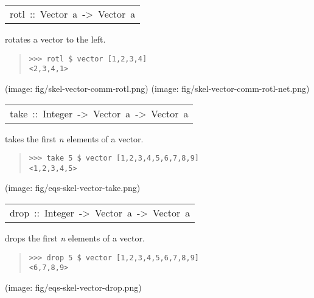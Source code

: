 \begin{haddockdesc}
\item[\begin{tabular}{@{}l}
rotl\ ::\ Vector\ a\ ->\ Vector\ a
\end{tabular}]\haddockbegindoc
rotates a vector to the left.\par
\begin{quote}
{\haddockverb\begin{verbatim}
>>> rotl $ vector [1,2,3,4]
<2,3,4,1>

\end{verbatim}}
\end{quote}(image: fig/skel-vector-comm-rotl.png)
 (image: fig/skel-vector-comm-rotl-net.png)\par
           
\end{haddockdesc}
\begin{haddockdesc}
\item[\begin{tabular}{@{}l}
take\ ::\ Integer\ ->\ Vector\ a\ ->\ Vector\ a
\end{tabular}]\haddockbegindoc
takes the first \emph{n} elements of a vector.\par
\begin{quote}
{\haddockverb\begin{verbatim}
>>> take 5 $ vector [1,2,3,4,5,6,7,8,9]
<1,2,3,4,5>

\end{verbatim}}
\end{quote}(image: fig/eqs-skel-vector-take.png)\par
           
\end{haddockdesc}
\begin{haddockdesc}
\item[\begin{tabular}{@{}l}
drop\ ::\ Integer\ ->\ Vector\ a\ ->\ Vector\ a
\end{tabular}]\haddockbegindoc
drops the first \emph{n} elements of a vector.\par
\begin{quote}
{\haddockverb\begin{verbatim}
>>> drop 5 $ vector [1,2,3,4,5,6,7,8,9]
<6,7,8,9>

\end{verbatim}}
\end{quote}(image: fig/eqs-skel-vector-drop.png)\par
           
\end{haddockdesc}
